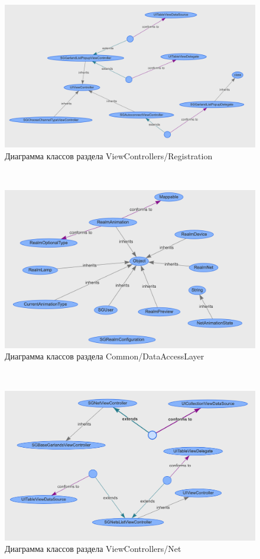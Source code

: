 \label{app:classDiagram}

~
\begin{figure}[H]
\centering
	\includegraphics[scale=0.5]{figures/diagrams/class/registration.png}
	\caption{Диаграмма классов раздела ViewControllers/Registration}
	\label{fig:appendices:classDiagram:registration}
\end{figure}
~
\begin{figure}[H]
\centering
	\includegraphics[scale=0.5]{figures/diagrams/class/realmData.png}
	\caption{Диаграмма классов раздела Common/DataAccessLayer}
	\label{fig:appendices:classDiagram:realmData}
\end{figure}
~
\begin{figure}[H]
\centering
	\includegraphics[scale=0.5]{figures/diagrams/class/net.png}
	\caption{Диаграмма классов раздела ViewControllers/Net}
	\label{fig:appendices:classDiagram:net}
\end{figure}
